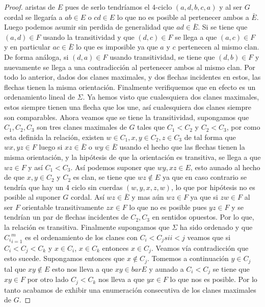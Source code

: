 \begin{proof}
    aristas de $E$ pues de serlo tendríamos el 4-ciclo $(a,d,b,c,a)$ y al ser
    $G$ cordal se llegaría a $ab\in E$ o $cd\in E$ lo que no es posible al
    pertenecer ambos a $\bar{E}$. Luego podemos asumir sin perdida de
    generalidad que $ad \in \bar{E}$. Si se tiene que $(a,d)\in F$ usando la
    transitividad y que $(d,c)\in F$ se llega a que $(a,c)\in F$ y en particular
    $ac\in \bar{E}$ lo que es imposible ya que $a$ y $c$ pertenecen al mismo
    clan. De forma análoga, si $(d,a)\in F$ usando transitividad, se tiene que
    $(d,b)\in F$ y nuevamente se llega a una contradicción al pertenecer ambos
    al mismo clan. Por todo lo anterior, dados dos clanes maximales, y dos
    flechas incidentes en estos, las flechas tienen la misma orientación.
    Finalmente verifiquemos que en efecto es un ordenamiento lineal de $\Sigma$.
    Ya hemos visto que cualesquiera dos clanes maximales, estos siempre tienen
    una flecha que los une, así cualesquiera dos clanes siempre son comparables.
    Ahora veamos que se tiene la transitividad, supongamos que $C_1,C_2, C_3$
    son tres clanes maximales de $G$ tales que $C_1<C_2$ y $C_2 <C_3$, por como
    esta definida la relación, existen $w\in C_1, x,y\in C_2, z\in C_3$ de tal
    forma que $wx, yz \in F$ luego si $xz \in \bar{E}$ o $wy \in \bar{E}$ usando
    el hecho que las flechas tienen la misma orientación, y la hipótesis de que
    la orientación es transitiva, se llega a que $wz \in F$ y así $C_1 < C_3$.
    Así podemos suponer que $wy, xz \in E$, esto aunado al hecho de que $x,y\in
    C_2$ y $C_2$ es clan, se tiene que $wz\notin E$ ya que en caso contrario se
    tendría que hay un 4 ciclo sin cuerdas $(w,y,x,z,w)$, lo que por hipótesis
    no es posible al suponer $G$ cordal. Así $wz\in \bar{E}$ y mas aún $wz \in
    F$ ya que si $zw\in F$ al ser $F$ orientable transitivamente $zx \in F$ lo
    que no es posible pues $yz\in F$ y se tendrían un par de flechas incidentes
    de $C_2, C_3$ en sentidos opuestos. Por lo que, la relación es transitiva.
    Finalmente supongamos que $\Sigma$ ha sido ordenado y que ${C_i}_{i=1}^m$ es
    el ordenamiento de los clanes con $C_i<C_j si i<j$ veamos que si
    $C_i<C_j<C_k$ y $x\in C_i $, $x\in C_k$ entonces $x\in C_j$. Veamos vía
    contradicción que esto sucede. Supongamos entonces que $x\notin C_j$.
    Tomemos a continuación $y\in C_j$ tal que $xy\notin E$ esto nos lleva a que
    $xy\in bar{E}$ y aunado a $C_i<C_j$ se tiene que $xy\in F$ por otro lado
    $C_j< C_k$ nos lleva a que $yx\in F$ lo que nos es posible. Por lo tanto
    acabamos de exhibir una enumeración consecutiva de los clanes maximales de
    $G$.


\end{proof}
